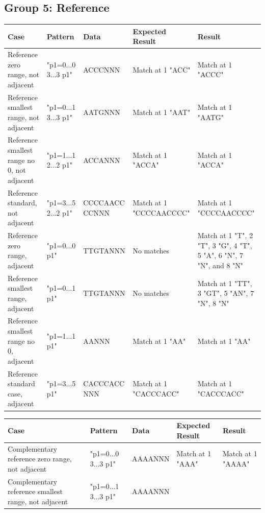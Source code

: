 \documentclass[12pt]{article}
\newcommand{\textapprox}{\raisebox{0.5ex}{\texttildelow}}
\begin{document}
\begin{appendices}
\subsection{Group 5: Reference}
\begin{table}[H]
\begin{tabular}{p{4cm}|p{3cm}|p{2.5cm}|p{2.5cm}|p{2.5cm}}
Case 			& Pattern & Data & Expected Result & Result \\ \hline
\rowcolor{lightred}
Reference zero range, not adjacent 	& "p1=0...0 3...3 p1" & ACCCNNN & Match at 1 "ACC" & Match at 1 "ACCC" \\ \hline
\rowcolor{lightred}
Reference smallest range, not adjacent	& "p1=0...1 3...3 p1" & AATGNNN & Match at 1 "AAT" & Match at 1 "AATG" \\ \hline
\rowcolor{lightgreen}
Reference smallest range no 0, not adjacent & "p1=1...1 2...2 p1" & ACCANNN & Match at 1 "ACCA" & Match at 1 "ACCA" \\ \hline
\rowcolor{lightgreen}
Reference standard, not adjacent& "p1=3...5 2...2 p1" & CCCCAACC CCNNN & Match at 1 "CCCCAACCCC" & 
Match at 1 "CCCCAACCCC"\\ \hline
\rowcolor{lightred}
Reference zero range, adjacent	& "p1=0...0 p1" & TTGTANNN & No matches & Match at 1 "T", 2 "T", 3 "G", 4 "T", 
5 "A", 6 "N", 7 "N", and 8 "N"\\ \hline
\rowcolor{lightred}
Reference smallest range, adjacent	& "p1=0...1 p1" & TTGTANNN & No matches & 
Match at 1 "TT", 3 "GT", 5 "AN", 7 "N", 8 "N"\\ \hline
\rowcolor{lightgreen}
Reference smallest range no 0, adjacent & "p1=1...1 p1" & AANNN & Match at 1 "AA" & Match at 1 "AA" \\ \hline
\rowcolor{lightgreen}
Reference standard case, adjacent & "p1=3...5 p1" & CACCCACC NNN & Match at 1 "CACCCACC" & Match at 1 "CACCCACC" \\ \hline
\end{tabular}
\end{table}
\begin{table}[H]
\begin{tabular}{p{4cm}|p{3cm}|p{2.5cm}|p{2.5cm}|p{2.5cm}}
Case 			& Pattern & Data & Expected Result & Result \\ \hline
\rowcolor{lightred}
Complementary reference zero range, not adjacent & "p1=0...0 3...3 \textapprox p1" & 
AAAANNN & Match at 1 "AAA" & Match at 1 "AAAA"\\ \hline
\rowcolor{lightred}
Complementary reference smallest range, not adjacent & "p1=0...1 3...3 \textapprox p1" & AAAANNN & 

\end{tabular}
\end{table}
\end{appendices}
\end{document}
